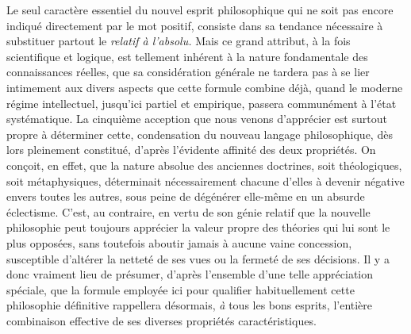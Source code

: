 \documentclass[french,twoside]{book} %
\begin{document}
Le seul caractère essentiel du nouvel esprit philosophique qui ne soit pas encore indiqué directement par le mot positif, consiste dans sa tendance nécessaire à substituer partout le {\itshape relatif à l’absolu.} Mais ce grand attribut, à la fois scientifique et logique, est tellement inhérent à la nature fondamentale des connaissances réelles, que sa considération générale ne tardera pas à se lier intimement aux divers aspects que cette formule combine déjà, quand le moderne régime intellectuel, jusqu’ici partiel et empirique, passera communément à l’état systématique. La cinquième acception que nous venons d’apprécier est surtout propre à déterminer cette, condensation du nouveau langage philosophique, dès lors pleinement constitué, d’après l’évidente affinité des deux propriétés. On conçoit, en effet, que la nature absolue des anciennes doctrines, soit théologiques, soit métaphysiques, déterminait nécessairement chacune d’elles à devenir négative envers toutes les autres, sous peine de dégénérer elle-même en un absurde éclectisme. C’est, au contraire, en vertu de son génie relatif que la nouvelle philosophie peut toujours apprécier la valeur propre des théories qui lui sont le plus opposées, sans toutefois aboutir jamais à aucune vaine concession, susceptible d’altérer la netteté de ses vues ou la fermeté de ses décisions. Il y a donc vraiment lieu de présumer, d’après l’ensemble d’une telle appréciation spéciale, que la formule employée ici pour qualifier habituellement cette philosophie définitive rappellera désormais, {\itshape à} tous les bons esprits, l’entière combinaison effective de ses diverses propriétés caractéristiques.\par
\end{document}
